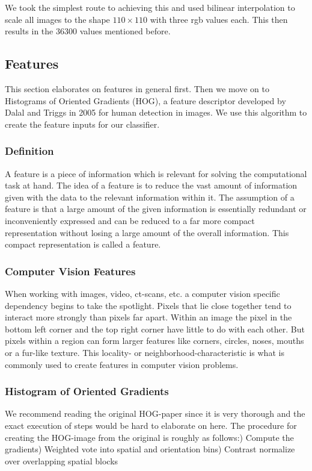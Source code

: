 \documentclass[journal, a4paper]{IEEEtran}
\begin{document}
We took the simplest route to achieving this and used bilinear interpolation to scale all images to the shape \( 110 \times 110 \) with three rgb values each. This then results in the 36300 values mentioned before.

\subsection{Features}
This section elaborates on features in general first. Then we move on to Histograms of Oriented Gradients (HOG), a feature descriptor developed by Dalal and Triggs in 2005 for human detection in images. We use this algorithm to create the feature inputs for our classifier.

\subsubsection{Definition}
A feature is a piece of information which is relevant for solving the computational task at hand. The idea of a feature is to reduce the vast amount of information given with the data to the relevant information within it. The assumption of a feature is that a large amount of the given information is essentially redundant or inconveniently expressed and can be reduced to a far more compact representation without losing a large amount of the overall information. This compact representation is called a feature.

\subsubsection{Computer Vision Features}
When working with images, video, ct-scans, etc. a computer vision specific dependency begins to take the spotlight. Pixels that lie close together tend to interact more strongly than pixels far apart. Within an image the pixel in the bottom left corner and the top right corner have little to do with each other. But pixels within a region can form larger features like corners, circles, noses, mouths or a fur-like texture. This locality- or neighborhood-characteristic is what is commonly used to create features in computer vision problems.

\subsubsection{Histogram of Oriented Gradients}
We recommend reading the original HOG-paper since it is very thorough and the exact execution of steps would be hard to elaborate on here. The procedure for creating the HOG-image from the original is roughly as follows:) Compute the gradients) Weighted vote into spatial and orientation bins) Contrast normalize over overlapping spatial blocks\newline
\end{document}
